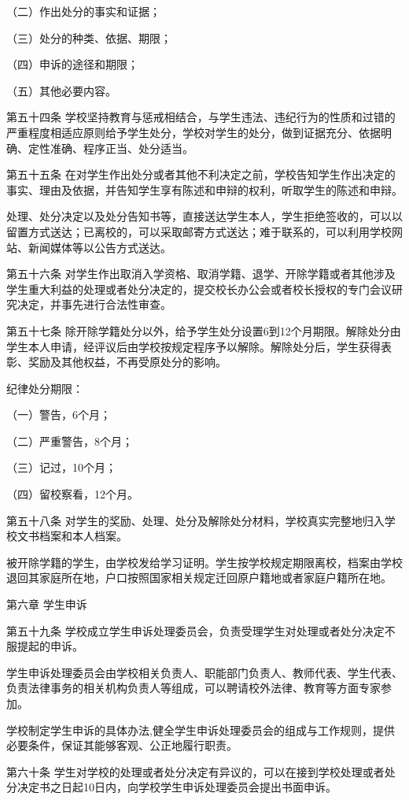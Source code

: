 \documentclass[UTF8,12pt,a4paper]{report}
\begin{document}
（二）作出处分的事实和证据；

（三）处分的种类、依据、期限；

（四）申诉的途径和期限；

（五）其他必要内容。

第五十四条 学校坚持教育与惩戒相结合，与学生违法、违纪行为的性质和过错的严重程度相适应原则给予学生处分，学校对学生的处分，做到证据充分、依据明确、定性准确、程序正当、处分适当。

第五十五条 在对学生作出处分或者其他不利决定之前，学校告知学生作出决定的事实、理由及依据，并告知学生享有陈述和申辩的权利，听取学生的陈述和申辩。

处理、处分决定以及处分告知书等，直接送达学生本人，学生拒绝签收的，可以以留置方式送达；已离校的，可以采取邮寄方式送达；难于联系的，可以利用学校网站、新闻媒体等以公告方式送达。

第五十六条 对学生作出取消入学资格、取消学籍、退学、开除学籍或者其他涉及学生重大利益的处理或者处分决定的，提交校长办公会或者校长授权的专门会议研究决定，并事先进行合法性审查。

第五十七条 除开除学籍处分以外，给予学生处分设置6到12个月期限。解除处分由学生本人申请，经评议后由学校按规定程序予以解除。解除处分后，学生获得表彰、奖励及其他权益，不再受原处分的影响。

纪律处分期限：

（一）警告，6个月；

（二）严重警告，8个月；

（三）记过，10个月；

（四）留校察看，12个月。

第五十八条 对学生的奖励、处理、处分及解除处分材料，学校真实完整地归入学校文书档案和本人档案。

被开除学籍的学生，由学校发给学习证明。学生按学校规定期限离校，档案由学校退回其家庭所在地，户口按照国家相关规定迁回原户籍地或者家庭户籍所在地。



第六章 学生申诉

第五十九条 学校成立学生申诉处理委员会，负责受理学生对处理或者处分决定不服提起的申诉。

学生申诉处理委员会由学校相关负责人、职能部门负责人、教师代表、学生代表、负责法律事务的相关机构负责人等组成，可以聘请校外法律、教育等方面专家参加。

学校制定学生申诉的具体办法,健全学生申诉处理委员会的组成与工作规则，提供必要条件，保证其能够客观、公正地履行职责。　　

第六十条 学生对学校的处理或者处分决定有异议的，可以在接到学校处理或者处分决定书之日起10日内，向学校学生申诉处理委员会提出书面申诉。
\end{document}
